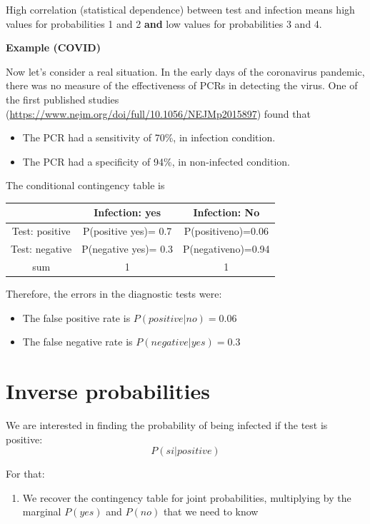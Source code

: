 \documentclass[
]{book}
\providecommand{\tightlist}{%
  \setlength{\itemsep}{0pt}\setlength{\parskip}{0pt}}
\begin{document}
High correlation (statistical dependence) between test and infection means high values for probabilities 1 and 2 \textbf{and} low values for probabilities 3 and 4.

\textbf{Example (COVID)}

Now let's consider a real situation. In the early days of the coronavirus pandemic, there was no measure of the effectiveness of PCRs in detecting the virus. One of the first published studies (\url{https://www.nejm.org/doi/full/10.1056/NEJMp2015897}) found that

\begin{itemize}
\tightlist
\item
  The PCR had a sensitivity of 70\%, in infection condition.
\item
  The PCR had a specificity of 94\%, in non-infected condition.
\end{itemize}

The conditional contingency table is

\begin{longtable}[]{@{}ccc@{}}
\toprule
& Infection: yes & Infection: No \\
\midrule
\endhead
Test: positive & P(positive{\textbar{}} yes)= 0.7 & P(positive{\textbar{}}no)=0.06 \\
Test: negative & P(negative{\textbar{}} yes)= 0.3 & P(negative{\textbar{}}no)=0.94 \\
sum & 1 & 1 \\
\bottomrule
\end{longtable}

Therefore, the errors in the diagnostic tests were:

\begin{itemize}
\tightlist
\item
  The false positive rate is \(P(positive| no)= 0.06\)
\item
  The false negative rate is \(P(negative| yes)= 0.3\)
\end{itemize}

\hypertarget{inverse-probabilities}{%
\section{Inverse probabilities}\label{inverse-probabilities}}

We are interested in finding the probability of being infected if the test is positive: \[P(si| positive)\]

For that:

\begin{enumerate}
\def\labelenumi{\arabic{enumi}.}
\tightlist
\item
  We recover the contingency table for joint probabilities, multiplying by the marginal \(P(yes)\) and \(P(no)\) that we need to know
\end{enumerate}
\end{document}
